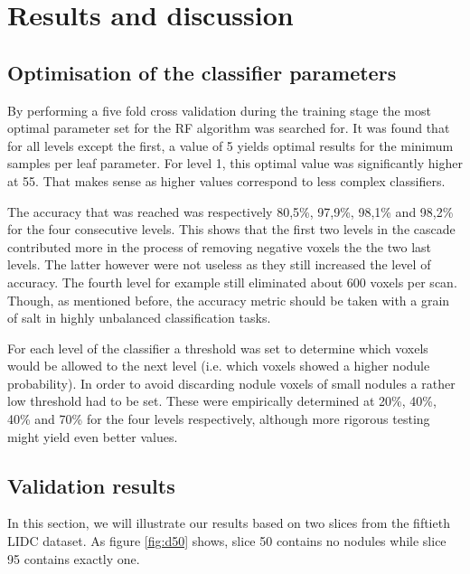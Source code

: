 \section{Results and discussion}
\subsection{Optimisation of the classifier parameters}
By performing a five fold cross validation during the training stage the most
optimal parameter set for the RF algorithm was searched for. It was found that
for all levels except the first, a value of 5 yields optimal results for the
minimum samples per leaf parameter. For level 1, this optimal value was
significantly higher at 55. That makes sense as higher values correspond to less
complex classifiers.

The accuracy that was reached was respectively 80,5\%, 97,9\%, 98,1\% and 98,2\%
for the four consecutive levels. This shows that the first two levels in the
cascade contributed more in the process of removing negative voxels the the two
last levels. The latter however were not useless as they still increased the
level of accuracy. The fourth level for example still eliminated about 600
voxels per scan. Though, as mentioned before, the accuracy metric should be taken
with a grain of salt in highly unbalanced classification tasks.

For each level of the classifier a threshold was set to determine which voxels
would be allowed to the next level (i.e. which voxels showed a higher nodule
probability). In order to avoid discarding nodule voxels of small nodules a
rather low threshold had to be set. These were empirically determined at 20\%,
40\%, 40\% and 70\% for the four levels respectively, although more rigorous
testing might yield even better values.

\subsection{Validation results}
In this section, we will illustrate our results based on two slices from the
fiftieth LIDC dataset. As figure \ref{fig:d50} shows, slice 50 contains no
nodules while slice 95 contains exactly one.

